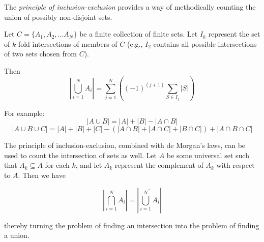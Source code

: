 \documentclass[12pt]{article}
\begin{document}
The \emph{principle of inclusion-exclusion} provides a way of methodically counting the union of possibly non-disjoint sets.

Let $C = \{A_1, A_2, \dots A_N\}$ be a finite collection of finite sets.  Let $I_k$ represent the set of $k$-fold intersections of members of $C$ (e.g., $I_2$ contains all possible intersections of two sets chosen from $C$).

Then
$$\left| \bigcup_{i=1}^{N} A_i \right| = \sum_{j=1}^N \left( (-1)^{(j+1)} \sum_{S \in I_j} |S| \right )$$

For example:
$$|A \cup B| = |A|+|B|-|A \cap B|$$
$$|A \cup B \cup C| = |A|+|B|+|C|-(|A \cap B|+|A \cap C|+|B \cap C|)+|A \cap B \cap C|$$

The principle of inclusion-exclusion, combined with de Morgan's laws, can be used to count the intersection of sets as well.  Let $A$ be some universal set such that $A_k \subseteq A$ for each $k$, and let $\overline{A_k}$ represent the complement of $A_k$ with respect to $A$.  Then we have

$$\left | \bigcap_{i=1}^N A_i \right | = \left |\overline{ \bigcup_{i=1}^N \overline{A_i} }\right |$$

thereby turning the problem of finding an intersection into the problem of finding a union.
\end{document}
